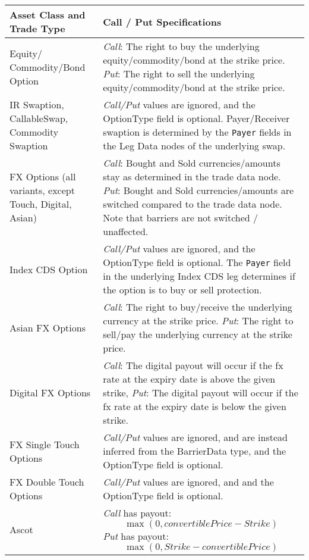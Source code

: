 \begin{itemize}
\begin{table}[H]
\centering
\begin{tabular} {|p{6cm}|p{8cm}|}
    \hline
      \bfseries{Asset Class and Trade Type}  & \bfseries{Call / Put Specifications} \\  \hline
Equity/ Commodity/Bond Option & \emph{Call}: The right to buy the underlying equity/commodity/bond at the strike price.
\newline \emph{Put}: The right to sell the underlying equity/commodity/bond at the strike price. \\  \hline
 IR Swaption, CallableSwap, Commodity Swaption&  \emph{Call/Put} values are ignored, and the OptionType field is optional. Payer/Receiver swaption is determined by the  \lstinline!Payer! fields in the Leg Data nodes of the underlying swap. \\ \hline
FX Options (all variants, except Touch, Digital, Asian) &  \emph{Call}: Bought and Sold currencies/amounts stay as determined in the trade data node. 
\newline \emph{Put}: Bought and Sold currencies/amounts are switched compared to the trade data node. Note that barriers are not switched / unaffected. \\ \hline
Index CDS Option &  \emph{Call/Put} values are ignored, and the OptionType field is optional. The \lstinline!Payer! field in the underlying Index CDS leg  determines if the option is to buy or sell protection. \\ \hline
Asian FX Options &  \emph{Call}: The right to buy/receive the underlying currency at the strike price.  \newline \emph{Put}: The right to sell/pay  the underlying currency at the strike price.   \\ \hline
Digital FX Options &  \emph{Call}: The digital payout will occur if the fx rate at the expiry date is above the given
strike, \newline \emph{Put}: The digital payout will occur if the fx rate at the expiry date is below the given strike.   \\ \hline
FX Single Touch Options &  \emph{Call/Put} values are ignored, and are instead inferred from the BarrierData type, and the OptionType field is optional.   \\ \hline
FX Double Touch Options &  \emph{Call/Put} values are ignored, and and the OptionType field is optional.  \\ \hline
Ascot &  \emph{Call} has payout: $$ \max(0, convertiblePrice - Strike) $$ \emph{Put} has payout: $$ \max(0, Strike - convertiblePrice) $$  \\ \hline


\end{tabular}
\end{table}
\end{itemize}
